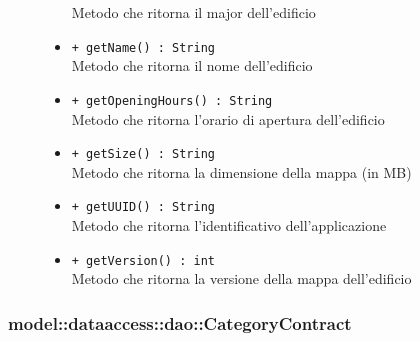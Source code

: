 \documentclass[../DefinizioneDiProdotto.tex]{subfiles}
\begin{document}
\begin{description}
\begin{itemize}
Metodo che ritorna il major dell'edificio
 \item \texttt{+ getName() : String}\\
Metodo che ritorna il nome dell'edificio
 \item \texttt{+ getOpeningHours() : String}\\
Metodo che ritorna l'orario di apertura dell'edificio
 \item \texttt{+ getSize() : String}\\
Metodo che ritorna la dimensione della mappa (in MB)
 \item \texttt{+ getUUID() : String}\\
Metodo che ritorna l'identificativo dell'applicazione
 \item \texttt{+ getVersion() : int}\\
Metodo che ritorna la versione della mappa dell'edificio
 \end{itemize}
\end{description}

\subsubsection{model::dataaccess::dao::CategoryContract}
\end{document}
